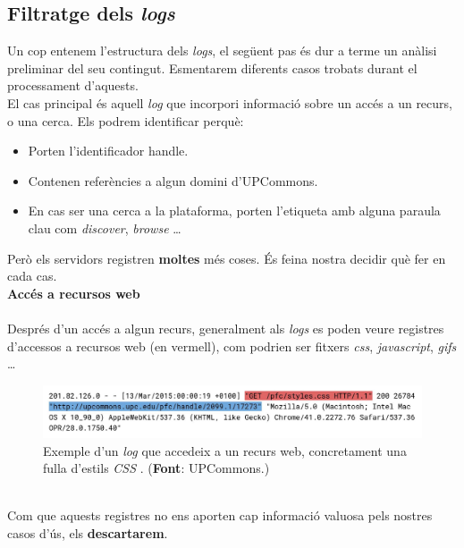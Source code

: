 \clearpage

\subsection{Filtratge dels \textit{\gls{log}s}}\label{subsec:log-filter}

Un cop entenem l'estructura dels \textit{logs}, el següent pas és dur a terme un anàlisi preliminar del seu contingut.
Esmentarem diferents casos trobats durant el processament d'aquests. \\

\noindent
El cas principal és aquell \textit{\gls{log}} que incorpori informació sobre un accés a un recurs, o una cerca.
Els podrem identificar perquè:

\begin{itemize}
    \item Porten l’identificador \gls{handle}.
    \item Contenen referències a algun domini d’\gls{UPCommons}.
    \item En cas ser una cerca a la plataforma, porten l’etiqueta amb alguna paraula clau com \textit{discover}, \textit{browse} \dots
\end{itemize}

\noindent
Però els servidors registren \textbf{moltes} més coses.
És feina nostra decidir què fer en cada cas. \\

\noindent
\textbf{Accés a recursos web} \\ \\
Després d’un accés a algun recurs, generalment als \textit{\gls{log}s} es poden veure registres d’accessos a recursos web (en vermell),
com podrien ser fitxers \textit{css}, \textit{javascript}, \textit{gifs} \dots

\begin{figure}[htbp]
    \centerline{\includegraphics[width=\textwidth]{figures/log-web-resource}}
    \captionsetup{justification=centering}
    \caption{Exemple d'un \textit{\gls{log}} que accedeix a un recurs web, concretament una fulla d'estils \textit{\gls{CSS}} . (\textbf{Font}: \gls{UPCommons}.)}\label{fig:log-web-resource}
\end{figure}

\noindent \\
Com que aquests registres no ens aporten cap informació valuosa pels nostres casos d'ús, els \textbf{descartarem}.

